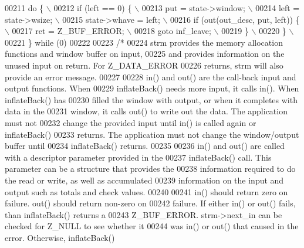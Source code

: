 \begin{DoxyCode}
00211 \textcolor{preprocessor}{    do \{ \(\backslash\)}
00212 \textcolor{preprocessor}{        if (left == 0) \{ \(\backslash\)}
00213 \textcolor{preprocessor}{            put = state->window; \(\backslash\)}
00214 \textcolor{preprocessor}{            left = state->wsize; \(\backslash\)}
00215 \textcolor{preprocessor}{            state->whave = left; \(\backslash\)}
00216 \textcolor{preprocessor}{            if (out(out\_desc, put, left)) \{ \(\backslash\)}
00217 \textcolor{preprocessor}{                ret = Z\_BUF\_ERROR; \(\backslash\)}
00218 \textcolor{preprocessor}{                goto inf\_leave; \(\backslash\)}
00219 \textcolor{preprocessor}{            \} \(\backslash\)}
00220 \textcolor{preprocessor}{        \} \(\backslash\)}
00221 \textcolor{preprocessor}{    \} while (0)}
00222 
00223 \textcolor{comment}{/*}
00224 \textcolor{comment}{   strm provides the memory allocation functions and window buffer on input,}
00225 \textcolor{comment}{   and provides information on the unused input on return.  For Z\_DATA\_ERROR}
00226 \textcolor{comment}{   returns, strm will also provide an error message.}
00227 \textcolor{comment}{}
00228 \textcolor{comment}{   in() and out() are the call-back input and output functions.  When}
00229 \textcolor{comment}{   inflateBack() needs more input, it calls in().  When inflateBack() has}
00230 \textcolor{comment}{   filled the window with output, or when it completes with data in the}
00231 \textcolor{comment}{   window, it calls out() to write out the data.  The application must not}
00232 \textcolor{comment}{   change the provided input until in() is called again or inflateBack()}
00233 \textcolor{comment}{   returns.  The application must not change the window/output buffer until}
00234 \textcolor{comment}{   inflateBack() returns.}
00235 \textcolor{comment}{}
00236 \textcolor{comment}{   in() and out() are called with a descriptor parameter provided in the}
00237 \textcolor{comment}{   inflateBack() call.  This parameter can be a structure that provides the}
00238 \textcolor{comment}{   information required to do the read or write, as well as accumulated}
00239 \textcolor{comment}{   information on the input and output such as totals and check values.}
00240 \textcolor{comment}{}
00241 \textcolor{comment}{   in() should return zero on failure.  out() should return non-zero on}
00242 \textcolor{comment}{   failure.  If either in() or out() fails, than inflateBack() returns a}
00243 \textcolor{comment}{   Z\_BUF\_ERROR.  strm->next\_in can be checked for Z\_NULL to see whether it}
00244 \textcolor{comment}{   was in() or out() that caused in the error.  Otherwise,  inflateBack()}

\end{DoxyCode}
